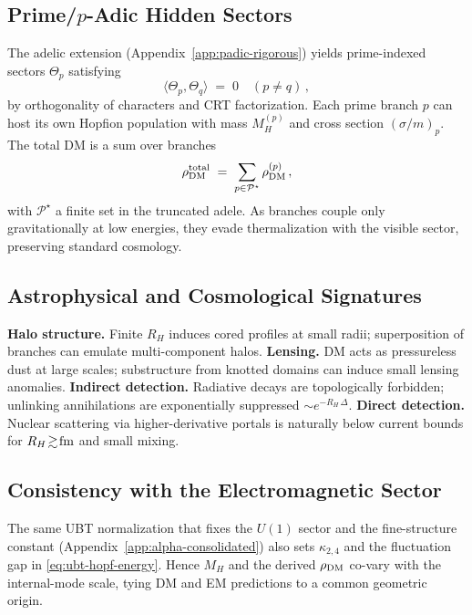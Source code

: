 \documentclass[12pt,a4paper]{article}
\begin{document}
\subsection{Prime/$p$-Adic Hidden Sectors}
The adelic extension (Appendix~\ref{app:padic-rigorous}) yields prime-indexed sectors $\Theta_p$ satisfying
\begin{equation}
\langle \Theta_p,\Theta_q\rangle \;=\; 0 \quad (p\neq q)\,,
\end{equation}
by orthogonality of characters and CRT factorization.
Each prime branch $p$ can host its own Hopfion population with mass $M_H^{(p)}$ and cross section $(\sigma/m)_p$.
The total DM is a sum over branches
\begin{equation}
\rho_{\rm DM}^{\rm total} \;=\; \sum_{p\in\mathcal{P}^\star}\rho_{\rm DM}^{(p)} \,,
\end{equation}
with $\mathcal{P}^\star$ a finite set in the truncated adele. As branches couple only gravitationally at low energies, they evade thermalization with the visible sector, preserving standard cosmology.

\subsection{Astrophysical and Cosmological Signatures}
\textbf{Halo structure.} Finite $R_H$ induces cored profiles at small radii; superposition of branches can emulate multi-component halos.
\textbf{Lensing.} DM acts as pressureless dust at large scales; substructure from knotted domains can induce small lensing anomalies.
\textbf{Indirect detection.} Radiative decays are topologically forbidden; unlinking annihilations are exponentially suppressed $\sim e^{-R_H\,\Delta}$.
\textbf{Direct detection.} Nuclear scattering via higher-derivative portals is naturally below current bounds for $R_H\!\gtrsim\!{\rm fm}$ and small mixing.

\subsection{Consistency with the Electromagnetic Sector}
The same UBT normalization that fixes the $U(1)$ sector and the fine-structure constant (Appendix~\ref{app:alpha-consolidated}) also sets $\kappa_{2,4}$ and the fluctuation gap in \eqref{eq:ubt-hopf-energy}.
Hence $M_H$ and the derived $\rho_{\rm DM}$ co-vary with the internal-mode scale, tying DM and EM predictions to a common geometric origin.
\end{document}
